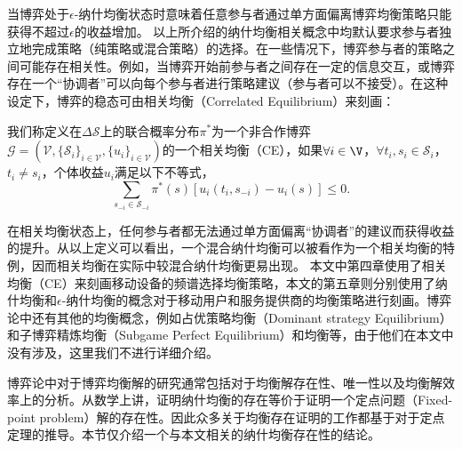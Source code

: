 当博弈处于$\epsilon$-纳什均衡状态时意味着任意参与者通过单方面偏离博弈均衡策略只能获得不超过$\epsilon$的收益增加。
以上所介绍的纳什均衡相关概念中均默认要求参与者独立地完成策略（纯策略或混合策略）的选择。在一些情况下，博弈参与者的策略之间可能存在相关性。例如，当博弈开始前参与者之间存在一定的信息交互，或博弈存在一个“协调者”可以向每个参与者进行策略建议（参与者可以不接受）。在这种设定下，博弈的稳态可由相关均衡（Correlated Equilibrium）来刻画：
\begin{df}[相关均衡]
我们称定义在$\Delta\mathcal{S}$上的联合概率分布$\pi^*$为一个非合作博弈$\mathcal{G}=(\mathcal{V},\{\mathcal{S}_i\}_{i\in\mathcal{V}},\{u_i\}_{i\in\mathcal{V}})$的一个相关均衡（CE），如果$\forall i\in\V$，$\forall t_{i},s_i\in\mathcal{S}_i$，$t_i\neq s_i$，个体收益$u_i$满足以下不等式，
\begin{equation}
\sum_{s_{-i}\in\mathcal{S}_{-i}}\pi^*(s)\left[u_i(t_i,s_{-i})-u_i(s)\right]\leq0.
\end{equation}
\end{df}

在相关均衡状态上，任何参与者都无法通过单方面偏离“协调者”的建议而获得收益的提升。从以上定义可以看出，一个混合纳什均衡可以被看作为一个相关均衡的特例，因而相关均衡在实际中较混合纳什均衡更易出现。
本文中第四章使用了相关均衡（CE）来刻画移动设备的频谱选择均衡策略，本文的第五章则分别使用了纳什均衡和$\epsilon$-纳什均衡的概念对于移动用户和服务提供商的均衡策略进行刻画。博弈论中还有其他的均衡概念，例如占优策略均衡（Dominant strategy Equilibrium）和子博弈精炼均衡（Subgame Perfect Equilibrium）和均衡等，由于他们在本文中没有涉及，这里我们不进行详细介绍。

博弈论中对于博弈均衡解的研究通常包括对于均衡解存在性、唯一性以及均衡解效率上的分析。从数学上讲，证明纳什均衡的存在等价于证明一个定点问题（Fixed-point problem）解的存在性。因此众多关于均衡存在证明的工作都基于对于定点定理的推导。本节仅介绍一个与本文相关的纳什均衡存在性的结论。


